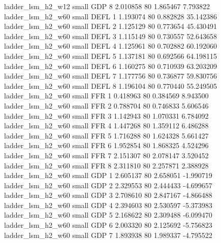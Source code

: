        ladder_lsm_h2_w12      small      GDP                 8 2.010858 80       1.865467           7.793822
       ladder_lsm_h2_w60      small     DEFL                 1 1.193074 80       0.882828          35.142386
       ladder_lsm_h2_w60      small     DEFL                 2 1.125129 80       0.773654          45.430491
       ladder_lsm_h2_w60      small     DEFL                 3 1.115149 80       0.730557          52.643658
       ladder_lsm_h2_w60      small     DEFL                 4 1.125961 80       0.702882          60.192060
       ladder_lsm_h2_w60      small     DEFL                 5 1.137181 80       0.692566          64.198115
       ladder_lsm_h2_w60      small     DEFL                 6 1.160275 80       0.710939          63.203209
       ladder_lsm_h2_w60      small     DEFL                 7 1.177756 80       0.736877          59.830756
       ladder_lsm_h2_w60      small     DEFL                 8 1.196104 80       0.770440          55.249505
       ladder_lsm_h2_w60      small      FFR                 1 0.418963 80       0.384569           8.943500
       ladder_lsm_h2_w60      small      FFR                 2 0.788704 80       0.746833           5.606546
       ladder_lsm_h2_w60      small      FFR                 3 1.142943 80       1.070331           6.784092
       ladder_lsm_h2_w60      small      FFR                 4 1.447268 80       1.359112           6.486288
       ladder_lsm_h2_w60      small      FFR                 5 1.716288 80       1.624328           5.661427
       ladder_lsm_h2_w60      small      FFR                 6 1.952854 80       1.868325           4.524296
       ladder_lsm_h2_w60      small      FFR                 7 2.151307 80       2.078147           3.520452
       ladder_lsm_h2_w60      small      FFR                 8 2.311810 80       2.257871           2.388928
       ladder_lsm_h2_w60      small      GDP                 1 2.605137 80       2.658051          -1.990719
       ladder_lsm_h2_w60      small      GDP                 2 2.329553 80       2.444433          -4.699657
       ladder_lsm_h2_w60      small      GDP                 3 2.708610 80       2.847167          -4.866488
       ladder_lsm_h2_w60      small      GDP                 4 2.394603 80       2.530597          -5.373983
       ladder_lsm_h2_w60      small      GDP                 5 2.168622 80       2.309488          -6.099470
       ladder_lsm_h2_w60      small      GDP                 6 2.003320 80       2.125692          -5.756823
       ladder_lsm_h2_w60      small      GDP                 7 1.893938 80       1.989337          -4.795522
